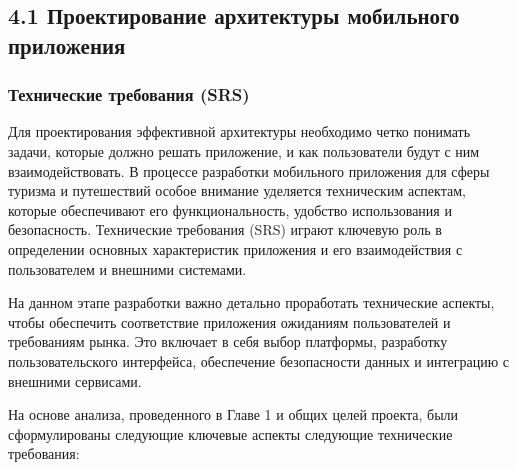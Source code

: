 \subsection*{4.1 Проектирование архитектуры мобильного приложения}


\subsubsection*{Технические требования (SRS)}


Для проектирования эффективной архитектуры необходимо четко понимать задачи, которые должно решать приложение, и как пользователи будут с ним взаимодействовать. В процессе разработки мобильного приложения для сферы туризма и путешествий особое внимание уделяется техническим аспектам, которые обеспечивают его функциональность, удобство использования и безопасность. Технические требования (SRS) играют ключевую роль в определении основных характеристик приложения и его взаимодействия с пользователем и внешними системами.

На данном этапе разработки важно детально проработать технические аспекты, чтобы обеспечить соответствие приложения ожиданиям пользователей и требованиям рынка. Это включает в себя выбор платформы, разработку пользовательского интерфейса, обеспечение безопасности данных и интеграцию с внешними сервисами.

На основе анализа, проведенного в Главе 1 и общих целей проекта, были сформулированы следующие ключевые аспекты следующие технические требования:


